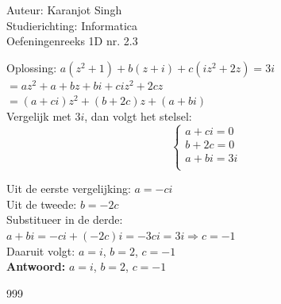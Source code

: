 \documentclass[a4paper]{article}
\begin{document}
\noindent \large Auteur: Karanjot Singh\\
\noindent \large Studierichting: Informatica\\
\noindent \large Oefeningenreeks 1D nr. 2.3\\

\normalsize

Oplossing: $a(z^2 + 1) + b(z + i) + c(iz^2 + 2z) = 3i$\\

$= az^2 + a + bz + bi + ciz^2 + 2cz$\\

$= (a + ci)z^2 + (b + 2c)z + (a + bi)$\\

Vergelijk met $3i$, dan volgt het stelsel:\\

$$
\left\{
\begin{array}{l}
a + ci = 0 \\
b + 2c = 0 \\
a + bi = 3i\\

\end{array}
\right.
$$

Uit de eerste vergelijking: $a = -ci$\\

Uit de tweede: $b = -2c$\\

Substitueer in de derde:\\

$a + bi = -ci + (-2c)i = -3ci = 3i \Rightarrow c = -1$\\

Daaruit volgt: $a = i$, $b = 2$, $c = -1$\\

\textbf{Antwoord:} $a = i$, $b = 2$, $c = -1$\\

\begin{thebibliography}{999}
\end{thebibliography}
\end{document}
